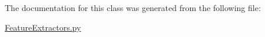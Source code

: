 \-The documentation for this class was generated from the following file\-:\begin{DoxyCompactItemize}
\item 
\hyperlink{FeatureExtractors_8py}{\-Feature\-Extractors.\-py}\end{DoxyCompactItemize}
